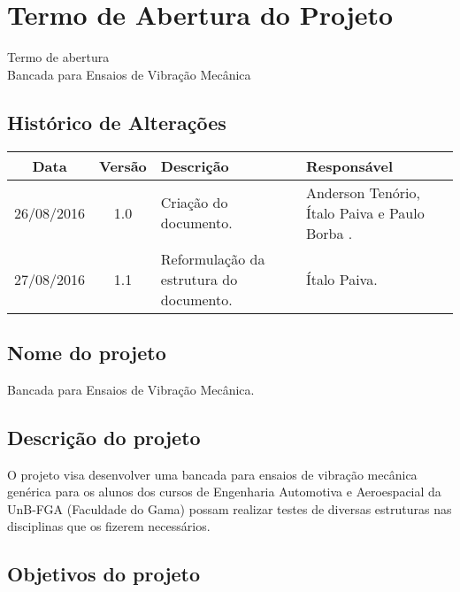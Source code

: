 \chapter{Termo de Abertura do Projeto}
	\label{tap}
% 	

\begin{center}
 {\large Termo de abertura}\\[0.2cm]
 {Bancada para Ensaios de Vibração Mecânica}\\
 \end{center}
 
 \section*{Histórico de Alterações}
\begin{table}[h]
\centering
\begin{tabular}{|c|c|p{6cm}|p{5cm}|}
\hline
Data & Versão & Descrição & Responsável\\
\hline                               
26/08/2016 & 1.0 & Criação do documento. & Anderson Tenório, Ítalo Paiva e Paulo Borba .\\
\hline                               
27/08/2016 & 1.1 & Reformulação da estrutura do documento. & Ítalo Paiva.\\
\hline
\end{tabular}
\end{table}

\section*{Nome do projeto}
  Bancada para Ensaios de Vibração Mecânica.
  
\section*{Descrição do projeto}

    O projeto visa desenvolver uma bancada para ensaios de vibração mecânica
    genérica para os alunos dos cursos de Engenharia Automotiva e Aeroespacial
    da UnB-FGA (Faculdade do Gama) possam realizar testes de diversas estruturas
    nas disciplinas que os fizerem necessários.

\section*{Objetivos do projeto}
  
